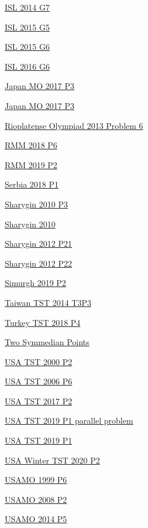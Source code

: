 \hyperref  [problem:ISL 2014 G7]{ISL 2014 G7}

\hyperref  [problem:ISL 2015 G5]{ISL 2015 G5}

\hyperref  [problem:ISL 2015 G6]{ISL 2015 G6}

\hyperref  [problem:ISL 2016 G6]{ISL 2016 G6}

\hyperref  [problem:Japan MO 2017 P3]{Japan MO 2017 P3}

\hyperref  [problem:Japan MO 2017 P3]{Japan MO 2017 P3}

\hyperref  [problem:Rioplatense Olympiad 2013 Problem 6]{Rioplatense Olympiad 2013 Problem 6}

\hyperref  [problem:RMM 2018 P6]{RMM 2018 P6}

\hyperref  [problem:RMM 2019 P2]{RMM 2019 P2}

\hyperref  [problem:Serbia 2018 P1]{Serbia 2018 P1}

\hyperref  [problem:Sharygin 2010 P3]{Sharygin 2010 P3}

\hyperref  [problem:Sharygin 2010]{Sharygin 2010}

\hyperref  [problem:Sharygin 2012 P21]{Sharygin 2012 P21}

\hyperref  [problem:Sharygin 2012 P22]{Sharygin 2012 P22}

\hyperref  [problem:Simurgh 2019 P2]{Simurgh 2019 P2}

\hyperref  [problem:Taiwan TST 2014 T3P3]{Taiwan TST 2014 T3P3}

\hyperref  [problem:Turkey TST 2018 P4]{Turkey TST 2018 P4}

\hyperref  [problem:Two Symmedian Points]{Two Symmedian Points}

\hyperref  [problem:USA TST 2000 P2]{USA TST 2000 P2}

\hyperref  [problem:USA TST 2006 P6]{USA TST 2006 P6}

\hyperref  [problem:USA TST 2017 P2]{USA TST 2017 P2}

\hyperref  [problem:USA TST 2019 P1 parallel problem]{USA TST 2019 P1 parallel problem}

\hyperref  [problem:USA TST 2019 P1]{USA TST 2019 P1}

\hyperref  [problem:USA Winter TST 2020 P2]{USA Winter TST 2020 P2}

\hyperref  [problem:USAMO 1999 P6]{USAMO 1999 P6}

\hyperref  [problem:USAMO 2008 P2]{USAMO 2008 P2}

\hyperref  [problem:USAMO 2014 P5]{USAMO 2014 P5}

